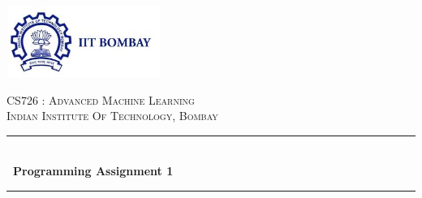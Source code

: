 \begin{titlepage}

\newcommand{\HRule}{\rule{\linewidth}{0.5mm}} %

\center
\includegraphics[width=5cm]{Title/logo.png}\\[1cm] %
 

\center %


\textsc{\LARGE CS726 : Advanced Machine Learning}\\[1.5cm] %
\textsc{\Large Indian Institute Of Technology, Bombay}\\[0.5cm] %

\makeatletter
\HRule \\[0.4cm]
{ \huge \bfseries \ Programming Assignment 1}\\[0.4cm] %
\HRule \\[1.5cm]
 


\end{titlepage}
